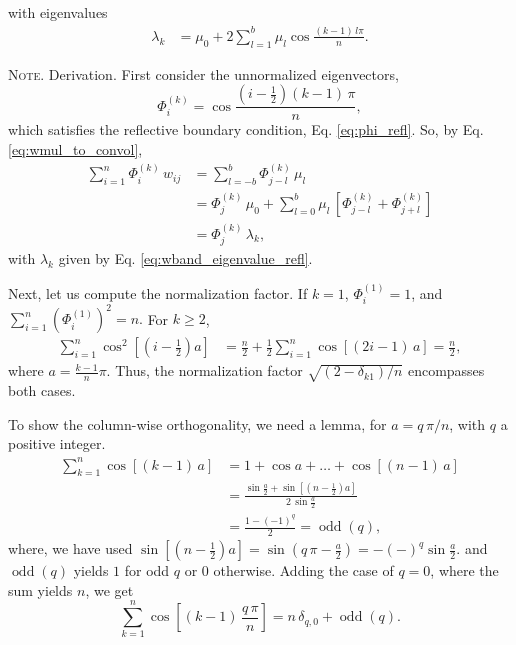 \documentclass[reprint, floatfix]{revtex4-1}
\newcommand{\note}[1]{{\color{DarkGreen}\footnotesize \textsc{Note.} #1}}
\begin{document}
%
with eigenvalues
%
\begin{align}
  \lambda_k
  &=
  \mu_0
  +
  2
  \sum_{l = 1}^b
    \mu_l
    \cos \frac{(k - 1)  \, l \pi}{n}
  .
\label{eq:wband_eigenvalue_refl}
\end{align}
%
\note{Derivation.
  First consider the unnormalized eigenvectors,
  $$
  \Phi^{(k)}_i
  =
  \cos \frac{ \left( i - \frac 1 2 \right) (k - 1) \, \pi}{n},
  $$
  which satisfies the reflective boundary condition,
  Eq. \eqref{eq:phi_refl}.
  So, by Eq. \eqref{eq:wmul_to_convol},
  $$
  \begin{aligned}
  \sum_{i = 1}^n
    \Phi^{(k)}_i \, w_{ij}
  &=
  \sum_{l = -b}^b
    \Phi^{(k)}_{j - l} \, \mu_l
  \\
  &=
    \Phi^{(k)}_j \, \mu_0
  + \sum_{l=0}^{b}
    \mu_l \,
    \left[
      \Phi^{(k)}_{j-l}
      +
      \Phi^{(k)}_{j+l}
    \right]
  \\
  &= \Phi^{(k)}_j \, \lambda_k,
  \end{aligned}
  $$
  with $\lambda_k$ given by Eq. \eqref{eq:wband_eigenvalue_refl}.

  \hrulefill

  Next, let us compute the normalization factor.
  If $k = 1$, $\Phi^{(1)}_i = 1$, and
  $
  \sum_{i = 1}^n \left( \Phi^{(1)}_i \right)^2 = n.
  $
  For $k \ge 2$,
  $$
  \begin{aligned}
    \sum_{i = 1}^n \cos^2 \left[\left(i - \frac1 2 \right) a\right]
    &=
    \frac n 2
    +
    \frac 1 2
    \sum_{i = 1}^n \cos\left[(2 i - 1)\, a \right]
    =
    \frac n 2,
  \end{aligned}
  $$
  where $a = \frac{k-1}{n} \pi$.
  Thus, the normalization factor $\sqrt{(2 - \delta_{k1})/n}$
  encompasses both cases.

  \hrulefill

  To show the column-wise orthogonality,
  we need a lemma, for $a = q \, \pi/n$,
  with $q$ a positive integer.
  $$
  \begin{aligned}
  \sum_{k = 1}^n \cos[(k - 1) \, a]
  &=
  1 + \cos a + \dots + \cos[(n - 1) \, a]
  \\
  &=
  \frac{
        \sin\frac a 2
      + \sin \left[ \left( n - \frac 1 2 \right) a \right]
      }
      {
        2 \, \sin \frac a 2
      }
  \\
  &=
  \frac{ 1 - (-1)^q } { 2 }
  = \operatorname{odd}(q),
  \end{aligned}
  $$
  where, we have used
  $\sin \left[ \left( n - \frac 1 2 \right) a \right]
  = \sin \left( q \, \pi - \frac a 2 \right)
  = -(-)^q\sin\frac a 2.$
  and $\operatorname{odd}(q)$
  yields $1$ for odd $q$ or $0$ otherwise.
  Adding the case of $q = 0$, where the sum yields $n$,
  we get
  $$
  \sum_{k = 1}^n
    \cos\left[(k - 1) \, \frac { q \, \pi } { n }  \right]
  = n \, \delta_{q, 0}
  + \operatorname{odd}(q).
  $$

}
\end{document}
